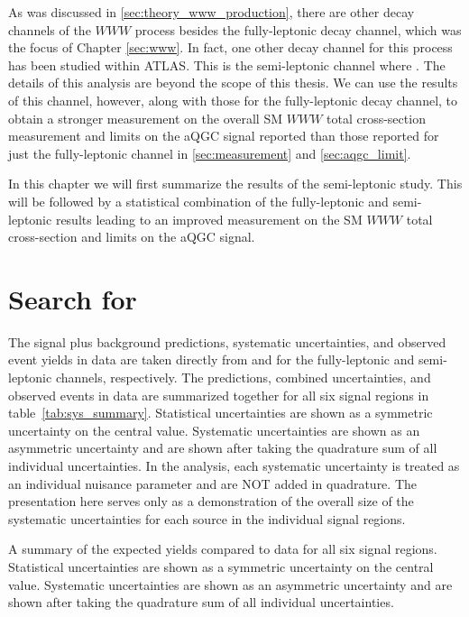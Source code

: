 
As was discussed in \sec\ref{sec:theory_www_production}, there are other decay
channels of the $WWW$ process besides the fully-leptonic decay channel,
which was the focus of Chapter \ref{sec:www}.  
In fact, one other decay channel for this process has been studied within 
ATLAS. This is the semi-leptonic channel where \wwwlljj. The details of this 
analysis are beyond the scope of this thesis. We can use the results of this channel,
however, along with those for the fully-leptonic decay channel, to obtain a stronger measurement
on the overall SM $WWW$ total cross-section measurement and limits on the aQGC signal reported than
those reported for just the fully-leptonic 
channel in \sec\ref{sec:measurement} and \sec\ref{sec:aqgc_limit}. 


In this chapter we will first summarize the results of the semi-leptonic study. 
This will be followed by a statistical combination of the fully-leptonic and semi-leptonic
results leading to an improved  
measurement on the SM $WWW$ total cross-section and limits on the 
aQGC signal.




\section{Search for \wwwlljj}

The signal plus background predictions, systematic uncertainties,
and observed event yields in data are taken directly from 
\cite{Butler:2030159} and \cite{Liu:2022894} 
for the fully-leptonic and 
semi-leptonic channels, respectively.  
The predictions, combined uncertainties, and observed events in data are summarized together for all six signal regions in table~\ref{tab:sys_summary}.  
Statistical uncertainties are shown as a symmetric uncertainty on the central value. Systematic uncertainties are shown as an asymmetric uncertainty and are shown after taking the quadrature sum of all individual uncertainties. 
In the analysis, each systematic uncertainty is treated as an individual nuisance parameter and are NOT added in quadrature.  The presentation here serves only as a demonstration of the overall size of the systematic uncertainties for each source in the individual signal regions.




\begin{landscape}
\begin{table}[h!]
\centering

\caption{A summary of the expected yields compared to data for all six signal regions.  
Statistical uncertainties are shown as a symmetric uncertainty on the central value. Systematic uncertainties are shown as an asymmetric uncertainty and are shown after taking the quadrature sum of all individual uncertainties. 
}
\label{tab:sys_summary}
\end{table}
\end{landscape}


